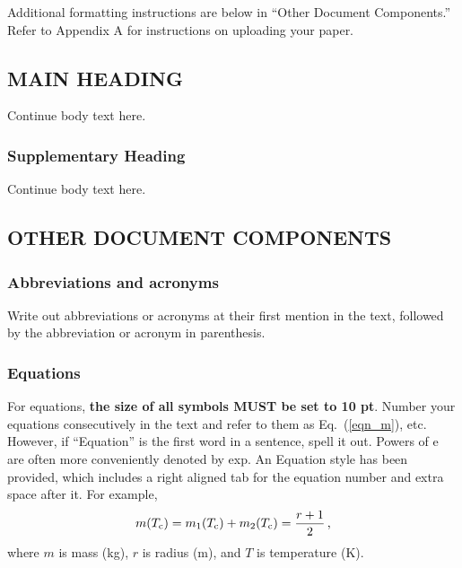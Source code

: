 \documentclass[fleqn,b5paper,10pt]{article}
\begin{document}
Additional formatting instructions are below in ``Other Document Components.'' Refer to Appendix A for instructions on uploading your paper.

\vspace*{-.67in} %

\subsection*{MAIN HEADING}

Continue body text here.

\subsubsection*{Supplementary Heading}

Continue body text here.

\subsection*{OTHER DOCUMENT COMPONENTS}

\subsubsection*{Abbreviations and acronyms}

Write out abbreviations or acronyms at their first mention in the text, followed by the abbreviation or acronym in parenthesis.

\subsubsection*{Equations}

For equations, \textbf{the size of all symbols MUST be set to 10 pt}. Number your equations consecutively in the text and refer to them as Eq.~(\ref{eqn_m}), etc. However, if ``Equation'' is the first word in a sentence, spell it out. Powers of e are often more conveniently denoted by exp. An Equation style has been provided, which includes a right aligned tab for the equation number and extra space after it. For example,
\begin{equation}
\label{eqn_m}
m(T_{\rm c}) = m_1(T_{\rm c}) + m_2(T_{\rm c}) = \frac{r+1}{2} \,\mbox{,}
\end{equation}
where $m$ is mass (kg), $r$ is radius (m), and $T$ is temperature (K).
\end{document}

